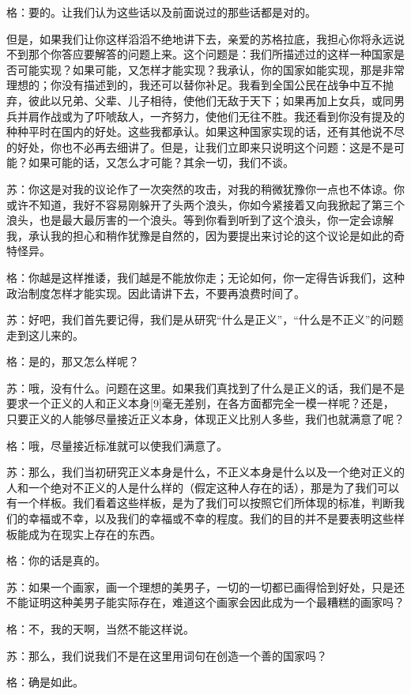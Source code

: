 \documentclass[12pt,oneside]{book}
\begin{document}
格：要的。让我们认为这些话以及前面说过的那些话都是对的。

但是，如果我们让你这样滔滔不绝地讲下去，亲爱的苏格拉底，我担心你将永远说不到那个你答应要解答的问题上来。这个问题是：我们所描述过的这样一种国家是否可能实现？如果可能，又怎样才能实现？我承认，你的国家如能实现，那是非常理想的；你没有描述到的，我还可以替你补足。我看到全国公民在战争中互不抛弃，彼此以兄弟、父辈、儿子相待，使他们无敌于天下；如果再加上女兵，或同男兵并肩作战或为了吓唬敌人，一齐努力，使他们无往不胜。我还看到你没有提及的种种平时在国内的好处。这些我都承认。如果这种国家实现的话，还有其他说不尽的好处，你也不必再去细讲了。但是，让我们立即来只说明这个问题：这是不是可能？如果可能的话，又怎么才可能？其余一切，我们不谈。

苏：你这是对我的议论作了一次突然的攻击，对我的稍微犹豫你一点也不体谅。你或许不知道，我好不容易刚躲开了头两个浪头，你如今紧接着又向我掀起了第三个浪头，也是最大最厉害的一个浪头。等到你看到听到了这个浪头，你一定会谅解我，承认我的担心和稍作犹豫是自然的，因为要提出来讨论的这个议论是如此的奇特怪异。

格：你越是这样推诿，我们越是不能放你走；无论如何，你一定得告诉我们，这种政治制度怎样才能实现。因此请讲下去，不要再浪费时间了。

苏：好吧，我们首先要记得，我们是从研究“什么是正义”，“什么是不正义”的问题走到这儿来的。

格：是的，那又怎么样呢？

苏：哦，没有什么。问题在这里。如果我们真找到了什么是正义的话，我们是不是要求一个正义的人和正义本身[9]毫无差别，在各方面都完全一模一样呢？还是，只要正义的人能够尽量接近正义本身，体现正义比别人多些，我们也就满意了呢？

格：哦，尽量接近标准就可以使我们满意了。

苏：那么，我们当初研究正义本身是什么，不正义本身是什么以及一个绝对正义的人和一个绝对不正义的人是什么样的（假定这种人存在的话），那是为了我们可以有一个样板。我们看着这些样板，是为了我们可以按照它们所体现的标准，判断我们的幸福或不幸，以及我们的幸福或不幸的程度。我们的目的并不是要表明这些样板能成为在现实上存在的东西。

格：你的话是真的。

苏：如果一个画家，画一个理想的美男子，一切的一切都已画得恰到好处，只是还不能证明这种美男子能实际存在，难道这个画家会因此成为一个最糟糕的画家吗？

格：不，我的天啊，当然不能这样说。

苏：那么，我们说我们不是在这里用词句在创造一个善的国家吗？

格：确是如此。
\end{document}
